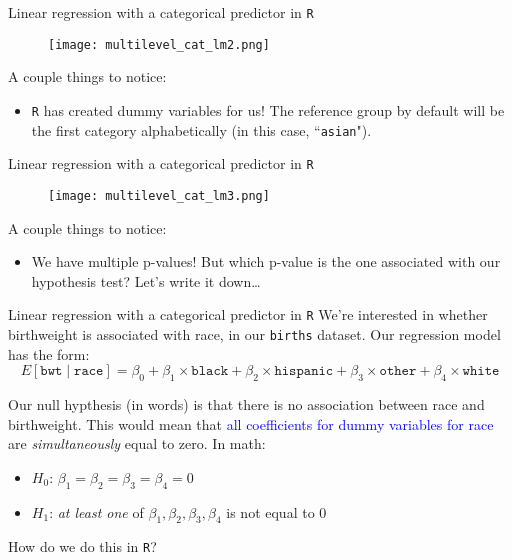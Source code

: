 \documentclass[10pt,t]{beamer}
\begin{document}
\begin{frame}{Linear regression with a categorical predictor in \texttt{R}}

\begin{figure}
	\centering \texttt{[image: multilevel\_cat\_lm2.png]}
\end{figure}

\vspace{0.1cm}

A couple things to notice:
\begin{itemize}
	\item \texttt{R} has created dummy variables for us! The reference group by default will be the first category alphabetically (in this case, ``\texttt{asian}").
\end{itemize}

\end{frame}

\begin{frame}{Linear regression with a categorical predictor in \texttt{R}}

\begin{figure}
	\centering \texttt{[image: multilevel\_cat\_lm3.png]}
\end{figure}

\vspace{0.1cm}

A couple things to notice:
\begin{itemize}
	\item We have multiple p-values! But which p-value is the one associated with our hypothesis test? Let's write it down\dots
\end{itemize}

\end{frame}

\begin{frame}{Linear regression with a categorical predictor in \texttt{R}}
We're interested in whether birthweight is associated with race, in our \texttt{births} dataset. Our regression model has the form:
$$
E[\texttt{bwt} \mid \texttt{race}] = \beta_0 + \beta_1 \times \texttt{black} + \beta_2 \times \texttt{hispanic} + \beta_3 \times \texttt{other} + \beta_4 \times \texttt{white}
$$ \pause

Our null hypthesis (in words) is that there is no association between race and birthweight. This would mean that \textcolor{blue}{all coefficients for dummy variables for race} are \textit{simultaneously} equal to zero. \pause In math:

\vspace{0.3cm}

\begin{itemize}
	\item $H_0$: $\beta_1 = \beta_2 = \beta_3 =\beta_4 =  0$
	\item $H_1$: \textit{at least one} of $\beta_1, \beta_2, \beta_3, \beta_4$ is not equal to $0$
\end{itemize} \pause

\vspace{0.3cm}

How do we do this in \texttt{R}?

\end{frame}
\end{document}
